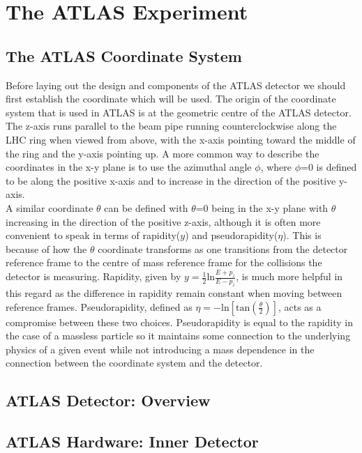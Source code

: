 \section{The ATLAS Experiment}
\label{Sec:ATLAS}

\subsection{The ATLAS Coordinate System}

Before laying out the design and components of the ATLAS detector we should first establish the coordinate which will be used.  
The origin of the coordinate system that is used in ATLAS is at the geometric centre of the ATLAS detector.  
The z-axis runs parallel to the beam pipe running counterclockwise along the LHC ring when viewed from above, with the x-axis pointing toward the middle of the ring and the y-axis pointing up.  
A more common way to describe the coordinates in the x-y plane is to use the azimuthal angle $\phi$, where $\phi$=0 is defined to be along the positive x-axis and to increase in the direction of the positive y-axis.\\

A similar coordinate $\theta$ can be defined with $\theta$=0 being in the x-y plane with $\theta$ increasing in the direction of the positive z-axis, although it is often more convenient to speak in terms of rapidity($y$) and pseudorapidity($\eta$).  
This is because of how the $\theta$ coordinate transforms as one transitions from the detector reference frame to the centre of mass reference frame for the collisions the detector is measuring.  
Rapidity, given by $y=\frac{1}{2}\mathrm{ln}\frac{E+p_{z}}{E-p_z}$, is much more helpful in this regard as the difference in rapidity remain constant when moving between reference frames.  
Pseudorapidity, defined as $\eta=-\mathrm{ln}\left[\mathrm{tan}\left(\frac{\theta}{2}\right)\right]$, acts as a compromise between these two choices.  
Pseudorapidity is equal to the rapidity in the case of a massless particle so it maintains some connection to the underlying physics of a given event while not introducing a mass dependence in the connection between the coordinate system and the detector.  


\subsection{ATLAS Detector: Overview}

\subsection{ATLAS Hardware: Inner Detector}

